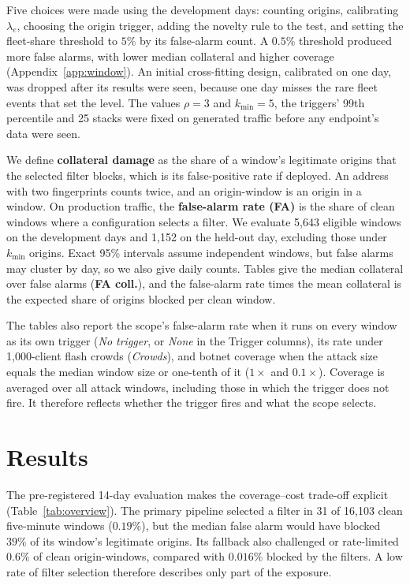 \documentclass[conference,letterpaper,10pt]{IEEEtran}
\newcommand\1{\textit{(i)}}
\newcommand\2{\textit{(ii)}}
\newcommand\3{\textit{(iii)}}
\newcommand\4{\textit{(iv)}}
\newcommand\5{\textit{(v)}}
\newcommand\6{\textit{(vi)}}
\newcommand\7{\textit{(vii)}}
\newcommand\8{\textit{(viii)}}
\newcommand\9{\textit{(ix)}}
\begin{document}
Five choices were made using the development days: counting origins, calibrating $\lambda_e$, choosing the origin trigger, adding the novelty rule to the test, and setting the fleet-share threshold to $5\%$ by its false-alarm count. A $0.5\%$ threshold produced more false alarms, with lower median collateral and higher coverage (Appendix~\ref{app:window}). An initial cross-fitting design, calibrated on one day, was dropped after its results were seen, because one day misses the rare fleet events that set the level. The values $\rho=3$ and $k_{\min}=5$, the triggers' 99th percentile and 25 stacks were fixed on generated traffic before any endpoint's data were seen.


We define \textbf{collateral damage} as the share of a window's legitimate origins that the selected filter blocks, which is its false-positive rate if deployed. An address with two fingerprints counts twice, and an origin-window is an origin in a window. On production traffic, the \textbf{false-alarm rate (FA)} is the share of clean windows where a configuration selects a filter. We evaluate 5,643 eligible windows on the development days and 1,152 on the held-out day, excluding those under $k_{\min}$ origins. Exact 95\% intervals assume independent windows, but false alarms may cluster by day, so we also give daily counts. Tables give the median collateral over false alarms (\textbf{FA coll.}), and the false-alarm rate times the mean collateral is the expected share of origins blocked per clean window.

The tables also report the scope's false-alarm rate when it runs on every window as its own trigger (\textit{No trigger}, or \textit{None} in the Trigger columns), its rate under 1,000-client flash crowds (\textit{Crowds}), and botnet coverage when the attack size equals the median window size or one-tenth of it ($1\times$ and $0.1\times$). Coverage is averaged over all attack windows, including those in which the trigger does not fire. It therefore reflects whether the trigger fires and what the scope selects.

\section{Results}
\label{sec:results}

The pre-registered 14-day evaluation makes the coverage--cost trade-off explicit (Table~\ref{tab:overview}). The primary pipeline selected a filter in 31 of 16,103 clean five-minute windows ($0.19\%$), but the median false alarm would have blocked $39\%$ of its window's legitimate origins. Its fallback also challenged or rate-limited $0.6\%$ of clean origin-windows, compared with $0.016\%$ blocked by the filters. A low rate of filter selection therefore describes only part of the exposure.
\end{document}
